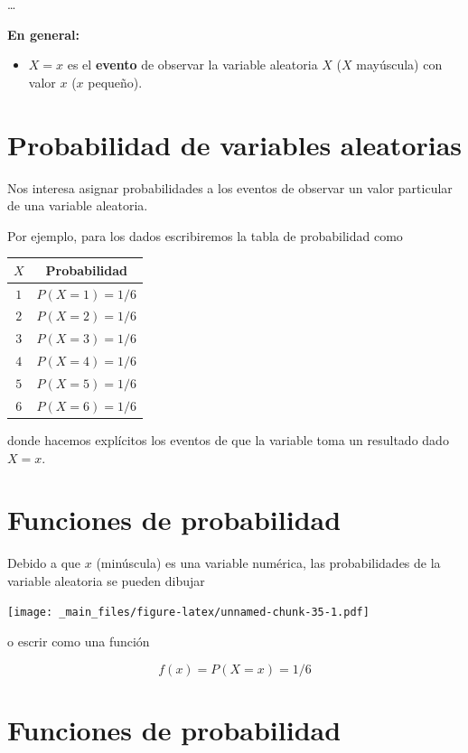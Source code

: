 \documentclass[
]{book}
\providecommand{\tightlist}{%
  \setlength{\itemsep}{0pt}\setlength{\parskip}{0pt}}
\begin{document}
\ldots{}

\textbf{En general:}

\begin{itemize}
\tightlist
\item
  \(X=x\) es el \textbf{evento} de observar la variable aleatoria \(X\) (\(X\) mayúscula) con valor \(x\) (\(x\) pequeño).
\end{itemize}

\hypertarget{probabilidad-de-variables-aleatorias}{%
\section{Probabilidad de variables aleatorias}\label{probabilidad-de-variables-aleatorias}}

Nos interesa asignar probabilidades a los eventos de observar un valor particular de una variable aleatoria.

Por ejemplo, para los dados escribiremos la tabla de probabilidad como

\begin{longtable}[]{@{}cc@{}}
\toprule\noalign{}
\(X\) & Probabilidad \\
\midrule\noalign{}
\endhead
\bottomrule\noalign{}
\endlastfoot
\(1\) & \(P(X=1)=1/6\) \\
\(2\) & \(P(X=2)=1/6\) \\
\(3\) & \(P(X=3)=1/6\) \\
\(4\) & \(P(X=4)=1/6\) \\
\(5\) & \(P(X=5)=1/6\) \\
\(6\) & \(P(X=6)=1/6\) \\
\end{longtable}

donde hacemos explícitos los eventos de que la variable toma un resultado dado \(X=x\).

\hypertarget{funciones-de-probabilidad}{%
\section{Funciones de probabilidad}\label{funciones-de-probabilidad}}

Debido a que \(x\) (minúscula) es una variable numérica, las probabilidades de la variable aleatoria se pueden dibujar

\texttt{[image: \_main\_files/figure-latex/unnamed-chunk-35-1.pdf]}

o escrir como una función

\[f(x)=P(X=x)=1/6\]

\hypertarget{funciones-de-probabilidad-1}{%
\section{Funciones de probabilidad}\label{funciones-de-probabilidad-1}}
\end{document}
